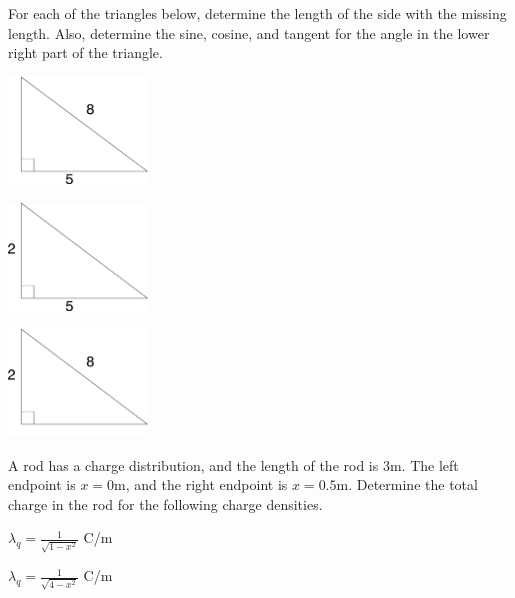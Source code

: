 \begin{problem}
\item For each of the triangles below, determine the length of the
  side with the missing length. Also, determine the sine, cosine, and tangent
  for the angle in the lower right part of the triangle.
  \begin{subproblem}
  \item \includegraphics[width=10em]{ink/trigSubs/triangleValuesBottomHyp}
    \vfill
  \item \includegraphics[width=10em]{ink/trigSubs/triangleValuesLeftBottom}
    \vfill
  \item \includegraphics[width=10em]{ink/trigSubs/triangleValuesLeftHyp}
    \vfill
  \end{subproblem}
\end{problem}



\begin{problem}
\item A rod has a charge distribution, and the length of the rod is
  3m. The left endpoint is $x=0$m, and the right endpoint is
  $x=0.5$m. Determine the total charge in the rod for the following
  charge densities. 
  \begin{subproblem}
    \item $\lambda_q = \frac{1}{\sqrt{1-x^2}}$ C/m
      \vfill
    \item $\lambda_q = \frac{1}{\sqrt{4-x^2}}$ C/m
      \vfill
  \end{subproblem}
\end{problem}

